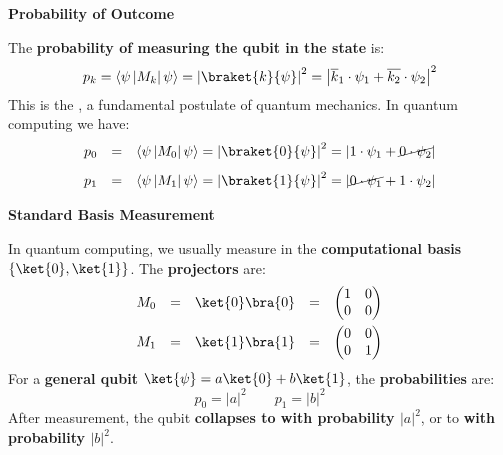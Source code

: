 \highspace
\begin{flushleft}
  \textcolor{Green3}{ \textbf{Probability of Outcome}}
\end{flushleft}
The \textbf{probability of measuring the qubit in the state}  is:
\begin{equation}
  p_{k} = \left\langle \psi \left| M_{k} \right| \psi \right\rangle = \left|\braket{k}{\psi}\right|^{2} =
  \left| \overline{k}_{1} \cdot \psi_{1} + \overline{k_{2}} \cdot \psi_{2} \right|^{2}
\end{equation}
This is the , a fundamental postulate of quantum mechanics. In quantum computing we have:
\begin{equation*}
  \begin{array}{rcl}
    p_{0} &=& \left\langle \psi \left|M_{0}\right| \psi \right\rangle = \left|\braket{0}{\psi}\right|^{2} = \left|1 \cdot \psi_{1} + \cancel{0 \cdot \psi_{2}} \right| \\ [.8em]
    p_{1} &=& \left\langle \psi \left|M_{1}\right| \psi \right\rangle = \left|\braket{1}{\psi}\right|^{2} = \left|\cancel{0 \cdot \psi_{1}} + 1 \cdot \psi_{2} \right|
  \end{array}
\end{equation*}

\highspace
\begin{flushleft}
  \textcolor{Green3}{ \textbf{Standard Basis Measurement}}
\end{flushleft}
In quantum computing, we usually measure in the \textbf{computational basis}\break $\left\{\ket{0}, \ket{1}\right\}$. The \textbf{projectors} are:
\begin{equation}
  \begin{array}{rclcl}
    M_{0} &=& \ket{0}\bra{0} &=& \begin{pmatrix}
      1 & 0 \\
      0 & 0
    \end{pmatrix} \\ [1em]
    M_{1} &=& \ket{1}\bra{1} &=& \begin{pmatrix}
      0 & 0 \\
      0 & 1
    \end{pmatrix}
  \end{array}
\end{equation}
For a \textbf{general qubit} $\ket{\psi} = a\ket{0} + b\ket{1}$, the \textbf{probabilities} are:
\begin{equation}
  p_{0} = \left|a\right|^{2} \hspace{2em} p_{1} = \left|b\right|^{2}
\end{equation}
After measurement, the qubit \textbf{collapses to  with probability $\left|a\right|^{2}$}, or to \textbf{ with probability $\left|b\right|^{2}$}.

